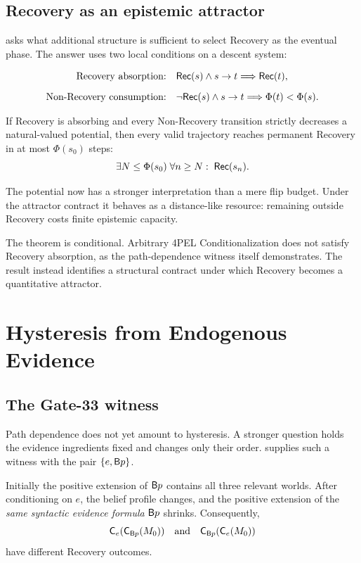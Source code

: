 \subsection{Recovery as an epistemic attractor}

 asks what additional structure is sufficient to select Recovery as the eventual phase. The answer uses two local conditions on a descent system:

\begin{align*}
\text{Recovery absorption:}\quad
&\mathsf{Rec}(s)\land s\to t \Longrightarrow \mathsf{Rec}(t),\\[2mm]
\text{Non-Recovery consumption:}\quad
&\neg\mathsf{Rec}(s)\land s\to t \Longrightarrow \Phi(t)<\Phi(s).
\end{align*}

\begin{theorem}
If Recovery is absorbing and every Non-Recovery transition strictly decreases a natural-valued potential, then every valid trajectory reaches permanent Recovery in at most $\Phi(s_0)$ steps:
\[
\exists N\leq \Phi(s_0)\;\forall n\geq N:\;\mathsf{Rec}(s_n).
\]
\end{theorem}

The potential now has a stronger interpretation than a mere flip budget. Under the attractor contract it behaves as a distance-like resource: remaining outside Recovery costs finite epistemic capacity.

The theorem is conditional. Arbitrary 4PEL Conditionalization does not satisfy Recovery absorption, as the path-dependence witness itself demonstrates. The result instead identifies a structural contract under which Recovery becomes a quantitative attractor.

\section{Hysteresis from Endogenous Evidence}

\subsection{The Gate-33 witness}

Path dependence does not yet amount to hysteresis. A stronger question holds the evidence ingredients fixed and changes only their order.  supplies such a witness with the pair $\{e,\mathsf{B} p\}$.

Initially the positive extension of $\mathsf{B} p$ contains all three relevant worlds. After conditioning on $e$, the belief profile changes, and the positive extension of the \emph{same syntactic evidence formula} $\mathsf{B} p$ shrinks. Consequently,
\[
\mathsf{C}_{e}(\mathsf{C}_{\mathsf{B} p}(M_0))
\quad\text{and}\quad
\mathsf{C}_{\mathsf{B} p}(\mathsf{C}_{e}(M_0))
\]
have different Recovery outcomes.

